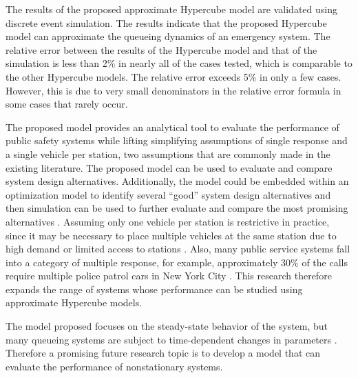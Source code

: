 \documentclass[11pt]{article}\topmargin 0mm
\begin{document}
The results of the proposed approximate Hypercube model are
validated using discrete event simulation. The results indicate
that the proposed Hypercube model can approximate the queueing
dynamics of an emergency system. The relative error between the
results of the Hypercube model and that of the simulation is
less than 2\% in nearly all of the cases tested, which
is comparable to the other Hypercube models.
The relative error exceeds 5\% in only a few cases. However, this is
due to very small denominators in the relative error formula in
some cases that rarely occur. %

{\color{blue}
The proposed model provides an analytical tool to evaluate the performance of public safety systems while lifting simplifying assumptions of single response and a single vehicle per station, two assumptions that are commonly made in the existing literature. The proposed model can be used to evaluate and compare system design alternatives. Additionally, the model could be embedded within an optimization model to identify several ``good'' system design alternatives and then simulation can be used to further evaluate and compare the most promising alternatives \citep{Ansari2013}.
%
Assuming only one vehicle per station is restrictive in practice, since it may be necessary to place multiple vehicles at the same station due to high demand or limited access to stations \citep{Budge-etal-09}. Also, many public service systems fall into a category of multiple response, for example, approximately 30\% of the calls require multiple police patrol cars in New York City \citep{green1984multiple}. This research therefore expands the range of systems whose performance can be studied using approximate Hypercube models.
%
}

{\color{blue}
The model proposed focuses on the steady-state behavior of the system, but many queueing systems are subject to time-dependent changes in parameters \citep{islam2009time, schwarz2016performance}. Therefore a promising future research topic is to develop a model that can evaluate the performance of nonstationary systems.
}
\end{document}
